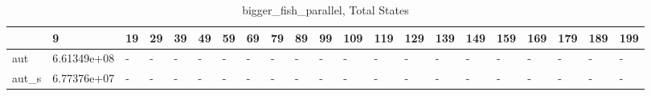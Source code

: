 \begin{table}
\caption{bigger_fish_parallel, Total States}
\label{bigger_fish_parallel_total}
\begin{tabular}{lllllllllllllllllllll}
\toprule
 & 9 & 19 & 29 & 39 & 49 & 59 & 69 & 79 & 89 & 99 & 109 & 119 & 129 & 139 & 149 & 159 & 169 & 179 & 189 & 199 \\
\midrule
aut & 6.61349e+08 & - & - & - & - & - & - & - & - & - & - & - & - & - & - & - & - & - & - & - \\
aut_s & 6.77376e+07 & - & - & - & - & - & - & - & - & - & - & - & - & - & - & - & - & - & - & - \\
\bottomrule
\end{tabular}
\end{table}
